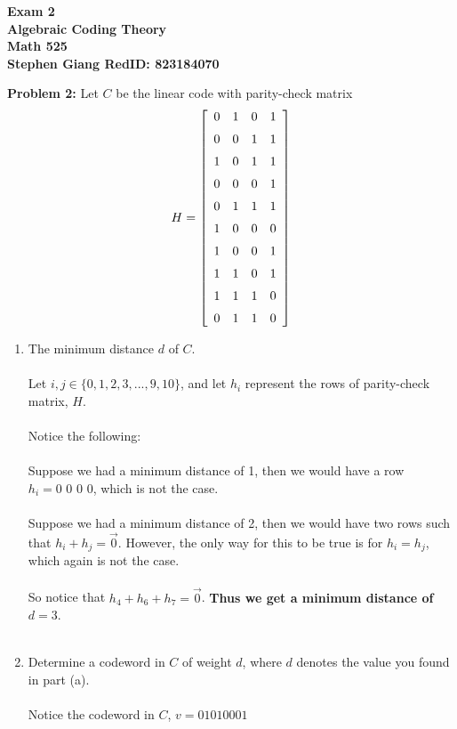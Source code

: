 \documentclass[11pt]{article}
\newcommand{\skipline}{\vspace{\baselineskip}}
\newenvironment{problem}[1]{\textbf{Problem #1: }}{\newpage}
\begin{document}
	
	\begin{center}
		\textbf{Exam 2} \\
		\textbf{Algebraic Coding Theory} \\
		\textbf{Math 525} \\
		\textbf{Stephen Giang RedID: 823184070} \\
		\skipline \skipline
	\end{center}

	\begin{problem}{2}
		Let $C$ be the linear code with parity-check matrix
		\[H = \left[\begin{array}{cccc}
			0&1&0&1 \\
			\noalign{\medskip} 0&0&1&1 \\
			\noalign{\medskip} 1&0&1&1 \\
			\noalign{\medskip} 0&0&0&1 \\
			\noalign{\medskip} 0&1&1&1 \\
			\noalign{\medskip} 1&0&0&0 \\
			\noalign{\medskip} 1&0&0&1 \\
			\noalign{\medskip} 1&1&0&1 \\
			\noalign{\medskip} 1&1&1&0 \\
			\noalign{\medskip} 0&1&1&0 \\
		\end{array}\right]\]	
		\begin{enumerate}[label = (\alph*)]
			\item The minimum distance $d$ of $C$. 
			\\ \\
			Let $i,j \in \{0,1,2,3,...,9,10\}$, and let $h_i$ represent the rows of parity-check matrix, $H$.
			\\ \\
			Notice the following: 
			\\ \\
			Suppose we had a minimum distance of 1, then we would have a row $h_i = 0\,\,0\,\,0\,\,0$, which is not the case.  
			\\ \\
			Suppose we had a minimum distance of 2, then we would have two rows such that $h_i + h_j = \vec{0}$.  However, the only way for this to be true is for $h_i = h_j$, which again is not the case.  
			\\ \\
			So notice that $h_4 + h_6 + h_7 = \vec{0}$. \textbf{\boldmath Thus we get a minimum distance of $d = 3$}.  
			\\ \\
			\item Determine a codeword in $C$ of weight $d$, where $d$ denotes the value you found in part (a).
			\\ \\
			Notice the codeword in $C$, $v = 01010001$
		\end{enumerate}	
	\end{problem}
\end{document}
